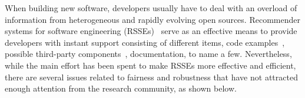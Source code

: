 

When building new software, developers usually have to deal with %
an overload of information %
from heterogeneous and rapidly evolving open sources. %
Recommender systems for software engineering (RSSEs)~\cite{DBLP:books/sp/rsse2014} serve as an effective means %
to provide developers with instant support %
consisting of different items, \eg code examples~\cite{Fowkes:2016:PPA:2950290.2950319,Nguyen:2019:FRS:3339505.3339636}, possible third-party components~\cite{NGUYEN2019110460,Ouni:2017:SSL:3032135.3032325,6671293}, documentation, to name a few. Nevertheless, while the main effort has been spent to make RSSEs more effective and efficient, there are several issues related to fairness and robustness that have not attracted enough attention from the research community, as shown below.






